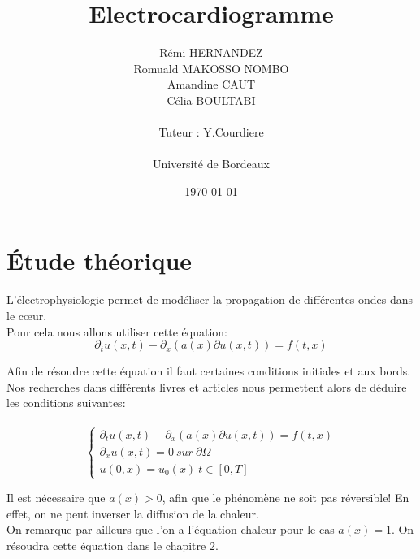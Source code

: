 \documentclass[a4paper,12pt,twoside]{report}
\title{
\vspace*{1in}
\textbf{Electrocardiogramme}}
\author{Rémi HERNANDEZ\\
        Romuald MAKOSSO NOMBO\\
        Amandine CAUT\\
        Célia BOULTABI\\
		\vspace*{0.5in} \\		
		Tuteur : Y.Courdiere \\	
		\vspace*{0.5in} \\		
		Université de Bordeaux\\		
       }
\date{\today} %
\begin{document}
\maketitle %




\pagebreak
\hspace{0pt}

\vfill
\hspace{0pt}
\pagebreak




\cleardoublepage
\tableofcontents %



\chapter{Étude théorique} 

L'électrophysiologie permet de modéliser la propagation de différentes ondes dans le cœur. \\
Pour cela nous allons utiliser cette équation:\\

$$\partial_t u(x,t) - \partial_x(a(x) \partial u(x,t)) = f(t,x)$$

Afin de résoudre cette équation il faut certaines conditions initiales et aux bords. Nos recherches dans différents livres et articles nous permettent alors de déduire les conditions suivantes: \\
\\
$$ 
\left\{ 
	\begin{array}{ll}
		\partial_t u(x,t) - \partial_x(a(x) \partial u(x,t)) = f(t,x) \\
		\partial_x u(x,t) = 0 \ sur \  \partial \Omega\\
		u(0,x) = u_0(x) \ t \in [0,T]
		
	\end{array}
\right. 
$$


Il est nécessaire que $a(x) > 0$, afin que le phénomène ne soit pas réversible! En effet, on ne peut inverser la diffusion de la chaleur. \\ 
On remarque par ailleurs que l'on a l'équation chaleur pour le cas $a(x) = 1$. On résoudra cette équation dans le chapitre 2.
\end{document}
